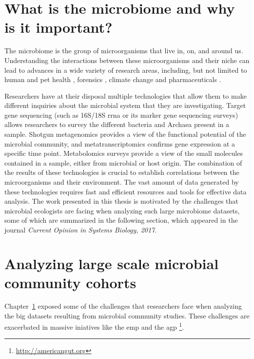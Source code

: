 \documentclass[12pt,chapterheads]{ucsd}
\begin{document}
%




\chapter{What is the microbiome and why is it important?}\label{chapter_overview}
\glsresetall

The microbiome is the group of microorganisms that live in, on, and around us.
Understanding the interactions between these microorganisms and their niche can
lead to advances in a wide variety of research areas, including, but not limited
to human and pet health \cite{Cox2015, Gevers2014, Vazquez-Baeza2016}, forensics
\cite{Fierer2010, Hyde2017}, climate change \cite{Tas2014} and pharmaceuticals
\cite{Novo2000, Maurice2013}.

Researchers have at their disposal multiple technologies that allow them to make
different inquiries about the microbial system that they are investigating.
Target gene sequencing (such as 16S/18S \gls{rrna} or \gls{its} marker gene
sequencing surveys) allows researchers to survey the different bacteria and
Archaea present in a sample. Shotgun metagenomics provides a view of the functional
potential of the microbial community, and metatranscriptomics confirms gene
expression at a specific time point. Metabolomics surveys provide a view of
the small molecules contained in a sample, either from microbial or host origin.
The combination of the results of these technologies is crucial to establish
correlations between the microorganisms and their environment. The vast amount
of data generated by these technologies requires fast and efficient resources
and tools for effective data analysis. The work presented in this thesis is
motivated by the challenges that microbial ecologists are facing when analyzing
such large microbiome datasets, some of which are summarized in the following
section, which appeared in the journal \textsl{Current Opinion in Systems Biology, 2017}.



\chapter{Analyzing large scale microbial community cohorts}\label{chapter_book}
\glsresetall

Chapter~\ref{chapter_overview} exposed some of the challenges that researchers
face when analyzing the big datasets resulting from microbial community
studies. These challenges are exacerbated in massive iniatives like
the \gls{emp} \cite{Gilbert2010, Gilbert2014, Thompson2017} and the \gls{agp}
\footnote{\label{agpurl}\url{http://americangut.org}}.
\end{document}
